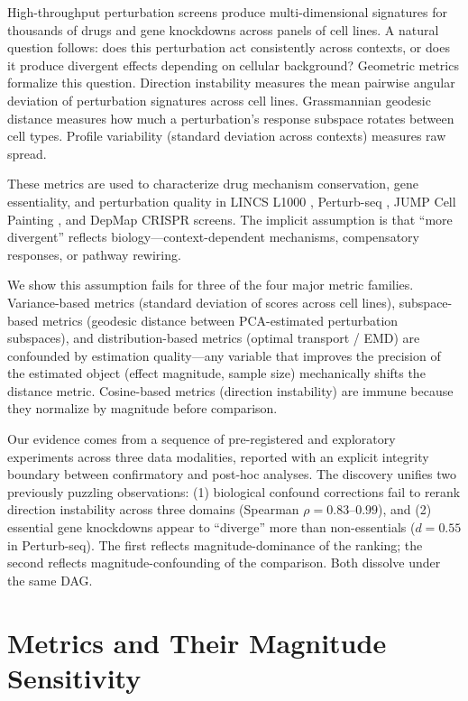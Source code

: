\documentclass[11pt]{article}
\begin{document}
High-throughput perturbation screens produce multi-dimensional signatures
for thousands of drugs and gene knockdowns across panels of cell lines.
A natural question follows: does this perturbation act consistently
across contexts, or does it produce divergent effects depending on
cellular background? Geometric metrics formalize this question.
Direction instability measures the mean pairwise angular deviation of
perturbation signatures across cell lines. Grassmannian geodesic
distance measures how much a perturbation's response subspace rotates
between cell types. Profile variability (standard deviation across
contexts) measures raw spread.

These metrics are used to characterize drug mechanism conservation, gene
essentiality, and perturbation quality in LINCS L1000
\citep{subramanian2017next}, Perturb-seq \citep{replogle2022mapping},
JUMP Cell Painting \citep{chandrasekaran2023jump}, and DepMap CRISPR
screens. The implicit assumption is that ``more divergent'' reflects
biology---context-dependent mechanisms, compensatory responses, or
pathway rewiring.

We show this assumption fails for three of the four major metric
families. Variance-based metrics (standard deviation of scores
across cell lines), subspace-based metrics (geodesic distance between
PCA-estimated perturbation subspaces), and distribution-based metrics
(optimal transport / EMD) are confounded by estimation quality---any
variable that improves the precision of the estimated object (effect
magnitude, sample size) mechanically shifts the distance metric.
Cosine-based metrics (direction instability) are immune because they
normalize by magnitude before comparison.

Our evidence comes from a sequence of pre-registered and exploratory
experiments across three data modalities, reported with an explicit
integrity boundary between confirmatory and post-hoc analyses. The
discovery unifies two previously puzzling observations: (1) biological
confound corrections fail to rerank direction instability across three
domains (Spearman $\rho = 0.83$--$0.99$), and (2) essential gene
knockdowns appear to ``diverge'' more than non-essentials ($d = 0.55$ in
Perturb-seq). The first reflects magnitude-dominance of the ranking; the
second reflects magnitude-confounding of the comparison. Both dissolve
under the same DAG.

\section{Metrics and Their Magnitude Sensitivity}
\end{document}
